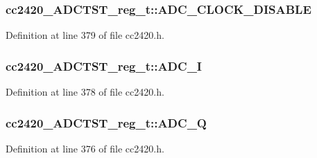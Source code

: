 \subsubsection[{\texorpdfstring{A\+D\+C\+\_\+\+C\+L\+O\+C\+K\+\_\+\+D\+I\+S\+A\+B\+LE}{ADC_CLOCK_DISABLE}}]{ cc2420\+\_\+\+A\+D\+C\+T\+S\+T\+\_\+reg\+\_\+t\+::\+A\+D\+C\+\_\+\+C\+L\+O\+C\+K\+\_\+\+D\+I\+S\+A\+B\+LE}\hypertarget{structcc2420___a_d_c_t_s_t__reg__t_a86c048161802ba91cace98d4bb4f5de4}{}\label{structcc2420___a_d_c_t_s_t__reg__t_a86c048161802ba91cace98d4bb4f5de4}


Definition at line 379 of file cc2420.\+h.

\subsubsection[{\texorpdfstring{A\+D\+C\+\_\+I}{ADC_I}}]{ cc2420\+\_\+\+A\+D\+C\+T\+S\+T\+\_\+reg\+\_\+t\+::\+A\+D\+C\+\_\+I}\hypertarget{structcc2420___a_d_c_t_s_t__reg__t_a1610157a2842c74bf3a0a15e2882c0ae}{}\label{structcc2420___a_d_c_t_s_t__reg__t_a1610157a2842c74bf3a0a15e2882c0ae}


Definition at line 378 of file cc2420.\+h.

\subsubsection[{\texorpdfstring{A\+D\+C\+\_\+Q}{ADC_Q}}]{ cc2420\+\_\+\+A\+D\+C\+T\+S\+T\+\_\+reg\+\_\+t\+::\+A\+D\+C\+\_\+Q}\hypertarget{structcc2420___a_d_c_t_s_t__reg__t_a40887db90b3f5ecd9e754e22c0c29fe4}{}\label{structcc2420___a_d_c_t_s_t__reg__t_a40887db90b3f5ecd9e754e22c0c29fe4}


Definition at line 376 of file cc2420.\+h.

